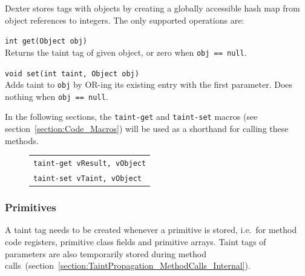 \documentclass[12pt,twoside,notitlepage]{report}
\newcommand{\centerbox}[1] {
	\begin{center}
	\begin{footnotesize}
	\begin{tabular}{l}
	#1
	\end{tabular}
	\end{footnotesize}
	\end{center}
}
\newcommand{\asm}[1] {\texttt{#1}}
\begin{document}
Dexter stores tags with objects by creating a globally accessible hash map from object references to integers. The only supported operations are:
\begin{description} 
\item \verb$int get(Object obj)$ \\
Returns the taint tag of given object, or zero when \verb$obj == null$.
\item \verb$void set(int taint, Object obj)$ \\
Adds taint to \verb$obj$ by OR-ing its existing entry with the first parameter. Does nothing when \verb$obj == null$.
\end{description}

In the following sections, the \verb$taint-get$ and \verb$taint-set$ macros (see section~\ref{section:Code_Macros}) will be used as a shorthand for calling these methods. 
	\begin{figure}[H]
		\centerbox{
			\asm{taint-get vResult, vObject} \\
			\asm{taint-set vTaint, vObject}
		}
	\end{figure}

\subsubsection{Primitives}

\label{section:TaintStorage_Primitives}

A taint tag needs to be created whenever a primitive is stored, i.e.\ for method code registers, primitive class fields and primitive arrays. Taint tags of parameters are also temporarily stored during method calls~(section~\ref{section:TaintPropagation_MethodCalls_Internal}).
\end{document}
